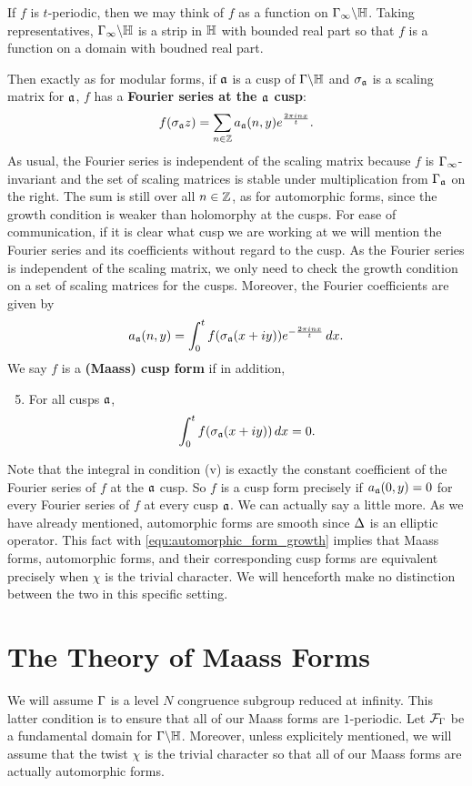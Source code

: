       \begin{remark}
        If $f$ is $t$-periodic, then we may think of $f$ as a function on $\Gamma_{\infty}\backslash\mathbb{H}$. Taking representatives, $\Gamma_{\infty}\backslash\mathbb{H}$ is a strip in $\mathbb{H}$ with bounded real part so that $f$ is a function on a domain with boudned real part.
      \end{remark}

      Then exactly as for modular forms, if $\mathfrak{a}$ is a cusp of $\Gamma\backslash\mathbb{H}$ and $\sigma_{\mathfrak{a}}$ is a scaling matrix for $\mathfrak{a}$, $f$ has a \textbf{Fourier series at the $\mathfrak{a}$ cusp}:
      \[
        f(\sigma_{\mathfrak{a}}z) = \sum_{n \in \mathbb{Z}}a_{\mathfrak{a}}(n,y)e^{\frac{2\pi inx}{t}}.
      \]
      As usual, the Fourier series is independent of the scaling matrix because $f$ is $\Gamma_{\infty}$-invariant and the set of scaling matrices is stable under multiplication from $\Gamma_{\mathfrak{a}}$ on the right. The sum is still over all $n \in \mathbb{Z}$, as for automorphic forms, since the growth condition is weaker than holomorphy at the cusps. For ease of communication, if it is clear what cusp we are working at we will mention the Fourier series and its coefficients without regard to the cusp. As the Fourier series is independent of the scaling matrix, we only need to check the growth condition on a set of scaling matrices for the cusps. Moreover, the Fourier coefficients are given by
      \[
        a_{\mathfrak{a}}(n,y) = \int_{0}^{t}f(\sigma_{\mathfrak{a}}(x+iy))e^{-\frac{2\pi inx}{t}}\,dx.
      \]
      We say $f$ is a \textbf{(Maass) cusp form} if in addition,
      \begin{enumerate}[label=(\roman*)]
        \setcounter{enumi}{4}
        \item For all cusps $\mathfrak{a}$,
        \[
          \int_{0}^{t}f(\sigma_{\mathfrak{a}}(x+iy))\,dx = 0.
        \]
      \end{enumerate}
      Note that the integral in condition (v) is exactly the constant coefficient of the Fourier series of $f$ at the $\mathfrak{a}$ cusp. So $f$ is a cusp form precisely if $a_{\mathfrak{a}}(0,y) = 0$ for every Fourier series of $f$ at every cusp $\mathfrak{a}$. We can actually say a little more. As we have already mentioned, automorphic forms are smooth since $\Delta$ is an elliptic operator. This fact with \cref{equ:automorphic_form_growth} implies that Maass forms, automorphic forms, and their corresponding cusp forms are equivalent precisely when $\chi$ is the trivial character. We will henceforth make no distinction between the two in this specific setting.
  \section{The Theory of Maass Forms}
    We will assume $\Gamma$ is a level $N$ congruence subgroup reduced at infinity. This latter condition is to ensure that all of our Maass forms are $1$-periodic. Let $\mathcal{F}_{\Gamma}$ be a fundamental domain for $\Gamma\backslash\mathbb{H}$. Moreover, unless explicitely mentioned, we will assume that the twist $\chi$ is the trivial character so that all of our Maass forms are actually automorphic forms.
